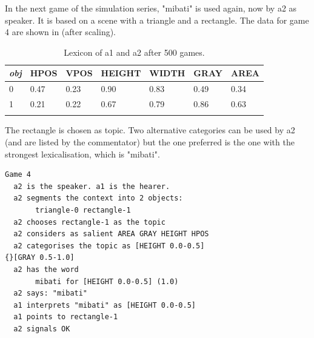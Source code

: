 In the next game of the simulation series, "mibati"
is used again, now by {\bfshape  a2} as speaker. It is 
based on a scene with a triangle and a rectangle.
The data for game 4 are shown in  (after scaling).  
\begin{table}
\begin{center}
\begin{tabular}{ l  l  l  l  l  l  l }
\lsptoprule
{\itshape obj} & HPOS & VPOS & HEIGHT & WIDTH & GRAY & AREA \\ \midrule
0 & 0.47 & 0.23 & 0.90 & 0.83 & 0.49 & 0.34\\ 
1 & 0.21 & 0.22 & 0.67 & 0.79 & 0.86 & 0.63\\ 
\lspbottomrule
\end{tabular}
\caption{\label{tab:mibati} Lexicon of a1 and a2 after 500 games.}
\end{center}
\end{table}
The rectangle is chosen as topic. Two alternative
categories can be used by {\bfshape  a2} (and are listed
by the commentator) but the one preferred
is the one with the strongest lexicalisation, which is 
"mibati".
\begin{verbatim}
Game 4
  a2 is the speaker. a1 is the hearer. 
  a2 segments the context into 2 objects: 
       triangle-0 rectangle-1
  a2 chooses rectangle-1 as the topic 
  a2 considers as salient AREA GRAY HEIGHT HPOS 
  a2 categorises the topic as [HEIGHT 0.0-0.5] 
{}[GRAY 0.5-1.0]
  a2 has the word
       mibati for [HEIGHT 0.0-0.5] (1.0)
  a2 says: "mibati"
  a1 interprets "mibati" as [HEIGHT 0.0-0.5]
  a1 points to rectangle-1
  a2 signals OK 
\end{verbatim}

